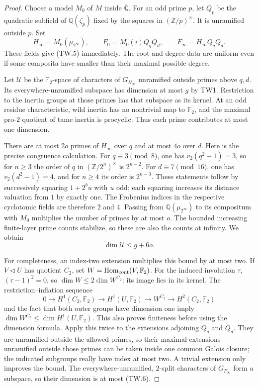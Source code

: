 \begin{proof}
Choose a model $M_0$ of $M$ inside $\overline{\mathbb Q}$.
For an odd prime $p$, let $Q_p$ be the quadratic subfield of
$\mathbb Q(\zeta_p)$ fixed by the squares in
$(\mathbb Z/p)^\times$.  It is unramified outside $p$.
Set
\[
 H_\infty=M_0(\mu_{2^\infty}),\qquad
 F_0=M_0(i)Q_qQ_d,\qquad
 F_\infty=H_\infty Q_qQ_d.                              \tag{TW.8}
\]
These fields give (TW.5) immediately.  The root and degree data
are uniform even if some composita have smaller than their maximal
possible degree.

Let $\mathcal U$ be the $\mathbb F_2$-space of characters of
$G_{H_\infty}$ unramified outside primes above $q,d$.
Its everywhere-unramified subspace has dimension at most $g$
by TW1.  Restriction to the inertia groups at those primes has
that subspace as its kernel.  At an odd residue characteristic,
wild inertia has no nontrivial map to $\mathbb F_2$, and the
maximal pro-$2$ quotient of tame inertia is procyclic.
Thus each prime contributes at most one dimension.

There are at most $2o$ primes of $H_\infty$ over $q$ and at most
$4o$ over $d$.  Here is the precise congruence calculation.
For $q\equiv3\pmod8$, one has $v_2(q^2-1)=3$, so for $n\ge3$
the order of $q$ in $(\mathbb Z/2^n)^\times$ is $2^{n-2}$.
For $d\equiv7\pmod{16}$, one has $v_2(d^2-1)=4$, and for
$n\ge4$ its order is $2^{n-3}$.  These statements follow by
successively squaring $1+2^b u$ with $u$ odd; each squaring
increases its distance valuation from $1$ by exactly one.
The Frobenius indices in the respective cyclotomic fields are
therefore $2$ and $4$.  Passing from $\mathbb Q(\mu_{2^\infty})$
to its compositum with $M_0$ multiplies the number of primes by
at most $o$.  The bounded increasing finite-layer prime counts
stabilize, so these are also the counts at infinity.  We obtain
\[
                     \dim\mathcal U\le g+6o.            \tag{TW.9}
\]

For completeness, an index-two extension multiplies this bound
by at most two.  If $V\triangleleft U$ has quotient $C_2$, set
$W=\operatorname{Hom}_{\rm cont}(V,\mathbb F_2)$.
For the induced involution $\tau$, $(\tau-1)^2=0$, so
$\dim W\le2\dim W^{C_2}$: its image lies in its kernel.
The restriction--inflation sequence
\[
 0\longrightarrow H^1(C_2,\mathbb F_2)
 \longrightarrow H^1(U,\mathbb F_2)
 \longrightarrow W^{C_2}
 \longrightarrow H^2(C_2,\mathbb F_2)
 \tag{TW.10}
\]
and the fact that both outer groups have dimension one imply
$\dim W^{C_2}\le\dim H^1(U,\mathbb F_2)$.
This also proves finiteness before using the dimension formula.
Apply this twice to the extensions adjoining $Q_q$ and $Q_d$.
They are unramified outside the allowed primes, so their maximal
extensions unramified outside those primes can be taken inside
one common Galois closure; the indicated subgroups really have
index at most two.  A trivial extension only improves the bound.
The everywhere-unramified, $2$-split characters of $G_{F_\infty}$
form a subspace, so their dimension is at most (TW.6).


\end{proof}
